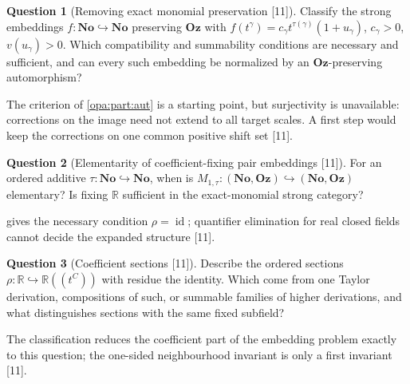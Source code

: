 \documentclass[11pt,oneside]{article}
\numberwithin{equation}{section}
\theoremstyle{definition}
\newtheorem{question}[question]{Question}
\theoremstyle{remark}
\newcommand{\No}{\mathbf{No}}
\newcommand{\Oz}{\mathbf{Oz}}
\newcommand{\R}{\mathbb R}
\newcommand{\id}{\operatorname{id}}
\newcommand{\Hahn}[2]{#1((t^{#2}))}
\newcommand{\src}[1]{\textup{\textsf{\small[#1]}}}
\begin{document}
\begin{question}[Removing exact monomial preservation \src{11}]\label{opa:as:q:units}
Classify the strong embeddings $f:\No\hookrightarrow\No$ preserving $\Oz$ with
$f(t^\gamma)=c_\gamma t^{\tau(\gamma)}(1+u_\gamma)$, $c_\gamma>0$, $v(u_\gamma)>0$. Which compatibility and summability
conditions are necessary and sufficient, and can every such embedding be normalized by an $\Oz$-preserving
automorphism?
\end{question}
The criterion of \cref{opa:part:aut} is a starting point, but surjectivity is unavailable: corrections on the image
need not extend to all target scales. A first step would keep the corrections on one common positive shift set
\src{11}.

\begin{question}[Elementarity of coefficient-fixing pair embeddings \src{11}]\label{opa:as:q:elementary}
For an ordered additive $\tau:\No\hookrightarrow\No$, when is $M_{1,\tau}:(\No,\Oz)\hookrightarrow(\No,\Oz)$
elementary? Is fixing $\R$ sufficient in the exact-monomial strong category?
\end{question}
 gives the necessary condition $\rho=\id$; quantifier elimination for real closed fields
cannot decide the expanded structure \src{11}.

\begin{question}[Coefficient sections \src{11}]\label{opa:as:q:sections}
Describe the ordered sections $\rho:\R\hookrightarrow\Hahn\R C$ with residue the identity. Which come from one Taylor
derivation, compositions of such, or summable families of higher derivations, and what distinguishes sections with the
same fixed subfield?
\end{question}
The classification reduces the coefficient part of the embedding problem exactly to this question; the one-sided
neighbourhood invariant is only a first invariant \src{11}.
\end{document}

